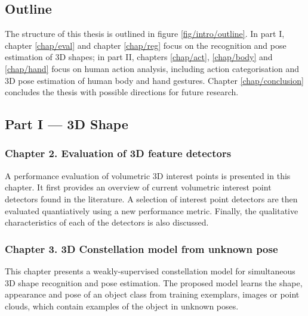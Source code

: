 \subsection{Outline}

The structure of this thesis is outlined in figure \ref{fig/intro/outline}. In part I, chapter \ref{chap/eval} and chapter \ref{chap/reg} focus on the recognition and pose estimation of 3D shapes; in part II, chapters \ref{chap/act}, \ref{chap/body} and \ref{chap/hand} focus on human action analysis, including action categorisation and 3D pose estimation of human body and hand gestures. Chapter \ref{chap/conclusion} concludes the thesis with possible directions for future research. 

\subsection*{Part I --- 3D Shape}


\subsubsection*{Chapter 2. Evaluation of 3D feature detectors} 
A performance evaluation of volumetric 3D interest points is presented in this chapter. 
It first provides an overview of current volumetric interest point detectors found in the literature.
A selection of interest point detectors are then evaluated quantiatively using a new performance metric. 
Finally, the qualitative characteristics of each of the detectors is also discussed. 

\subsubsection*{Chapter 3. 3D Constellation model from unknown pose}
This chapter presents a weakly-supervised constellation model for simultaneous 3D shape recognition and pose estimation. 
The proposed model learns the shape, appearance and pose of an object class from training exemplars, \eg images or point clouds, which contain examples of the object in unknown poses.  

